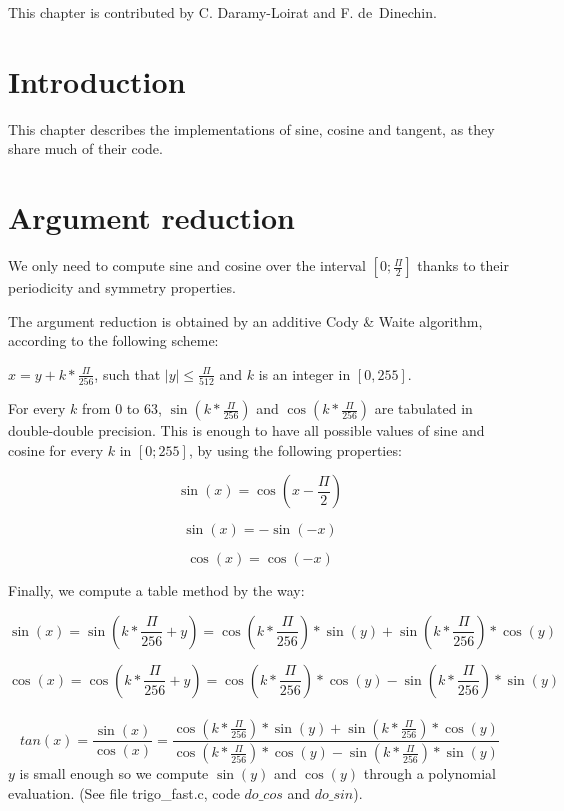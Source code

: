 This chapter is contributed by C. Daramy-Loirat
and F. de~Dinechin.  

\section*{Introduction}
This chapter describes the implementations of sine, cosine and
tangent, as they share much of their code.



\section{Argument reduction}
We only need to compute sine and cosine over the interval
$[0;\frac{\Pi}{2}]$ thanks to their periodicity and symmetry properties.

The argument reduction is obtained by an additive Cody \& Waite
algorithm, according to the following scheme:

$x = y + k*\frac{\Pi}{256}$, such that $ |y| \leq \frac{\Pi}{512}$ and
$k$ is an integer in $[0,255]$.


For every $k$ from 0 to 63, $\sin (k*\frac{\Pi}{256})$ and $\cos
(k*\frac{\Pi}{256})$ are tabulated in double-double precision. This is
enough to have all possible values of sine and cosine for every $k$ in
$[0;255]$, by using the following properties:
        
\begin{equation}        \sin(x) = \cos(x - \frac{\Pi}{2})\end{equation}

\begin{equation}        \sin(x) = -\sin(-x)\end{equation}

\begin{equation}        \cos(x) = \cos(-x)\end{equation}

Finally, we compute a table method by the way:

\begin{equation}        
  \sin(x) = \sin(k*\frac{\Pi}{256} + y) =  \cos(k*\frac{\Pi}{256})* \sin(y) +  \sin(k*\frac{\Pi}{256}) *\cos(y) 
\end{equation}

\begin{equation}
        \cos(x) = \cos(k*\frac{\Pi}{256} + y) = \cos(k*\frac{\Pi}{256})* \cos(y) -  \sin(k*\frac{\Pi}{256}) *\sin(y) \end{equation}\\\begin{equation} tan(x) = \frac{\sin(x)}{\cos(x)} = \frac{\cos(k*\frac{\Pi}{256})* \sin(y) +  \sin(k*\frac{\Pi}{256}) *\cos(y)}{\cos(k*\frac{\Pi}{256})* \cos(y) -  \sin(k*\frac{\Pi}{256}) *\sin(y)}
\end{equation}
$y$ is small enough so we compute $\sin(y)$ and $\cos(y)$ through a
polynomial evaluation. (See file trigo\_fast.c, code $do\_cos$ and
$do\_sin$).

